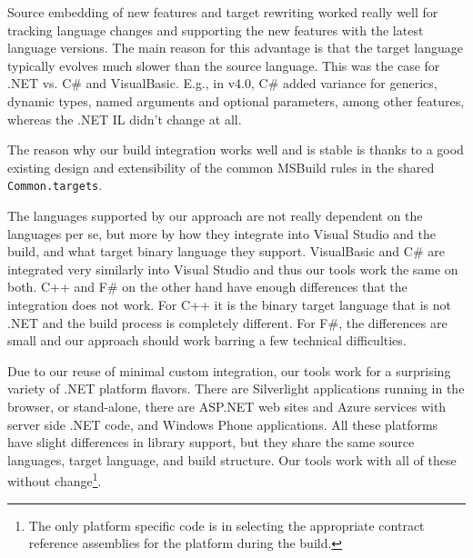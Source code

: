 \documentclass[10pt, conference, compsocconf]{IEEEtran}
\newcommand{\codefamily}{\sffamily}
\newcommand{\csharp}{C\#}
\newcommand{\code}[1]{\lstinline[basicstyle=\codefamily\small]{#1}}
\newcommand{\comment}[1]{}
\begin{document}
Source embedding of new features and target rewriting worked really
well for tracking language changes and supporting the new features
with the latest language versions. The main reason for this advantage
is that the target language typically evolves much slower than the
source language. This was the case for .NET vs. \csharp{} and
VisualBasic. E.g., in v4.0, \csharp{} added variance for generics,
dynamic types, named arguments and optional parameters, among other
features, whereas the .NET IL didn't change at all. 

The reason why our build integration works well and is stable is
thanks to a good existing design and extensibility of the common MSBuild rules
in the shared \code{Common.targets}. 

\comment{
It is interesting to see how information is exchanged among the
various parts of the IDE and our tools.

\begin{itemize}
\item Properties in msbuild files
\item .NET compiled assemblies (MSIL)
\item PDB files (program debugging information)
\item normal console text output for warnings
\item The Windows Registry
\end{itemize}
}

The languages supported by our approach are not really dependent on
the languages per se, but more by how they integrate into Visual
Studio and the build, and what target binary language they support.
VisualBasic and \csharp{} are integrated very
similarly into Visual Studio and thus our tools work the same on both. C++ and F\#
on the other hand have enough differences that the integration does
not work. For C++ it is the binary target language that is not .NET
and the build process is completely different. For F\#, the
differences are small and our approach should work barring a few
technical difficulties.

Due to our reuse of minimal custom integration, our tools work for a
surprising variety of .NET platform flavors. There are Silverlight
applications running in the browser, or stand-alone, there are ASP.NET
web sites and Azure services with server side .NET code, and Windows Phone
applications. All these platforms have slight differences in library
support, but they share the same source languages, target language,
and build structure. Our tools work with all of these without
change\footnote{The only platform specific code is in selecting the
  appropriate contract reference assemblies for the platform during
  the build.}.
\end{document}

